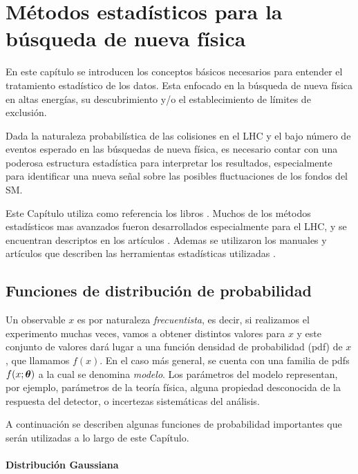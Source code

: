 \chapter{Métodos estadísticos para la búsqueda de nueva física}

En este capítulo se introducen los conceptos básicos necesarios para entender el
tratamiento estadístico de los datos. Esta enfocado en la búsqueda de nueva
física en altas energías, su descubrimiento y/o el establecimiento de límites de
exclusión.

Dada la naturaleza probabilística de las colisiones en el LHC y el bajo número
de eventos esperado en las búsquedas de nueva física, es necesario contar con
una poderosa estructura estadística para interpretar los resultados, especialmente
para identificar una nueva señal sobre las posibles fluctuaciones de los fondos
del SM.

Este Capítulo utiliza como referencia los libros \cite{Cowan,James}. Muchos de
los métodos estadísticos mas avanzados fueron desarrollados especialmente para
el LHC, y se encuentran descriptos en los artículos
\cite{AsymAprox,ReadCLs,medsigNote,Cranmer:2015nia}. Ademas se utilizaron los
manuales y artículos que describen las herramientas estadísticas utilizadas
\cite{Cranmer:1456844,HistFitter}.


\section{Funciones de distribución de probabilidad}

Un observable $x$ es por naturaleza \emph{frecuentista}, es decir, si realizamos
el experimento muchas veces, vamos a obtener distintos valores para $x$ y este
conjunto de valores dará lugar a una función densidad de probabilidad (pdf)
de $x$, que llamamos $f(x)$. En el caso más general, se cuenta con una familia
de pdfs $f(x;\bm{\theta})$ a la cual se denomina \emph{modelo}. Los parámetros del
modelo representan, por ejemplo, parámetros de la teoría física, alguna
propiedad desconocida de la respuesta del detector, o incertezas sistemáticas
del análisis.

A continuación se describen algunas funciones de probabilidad importantes que
serán utilizadas a lo largo de este Capítulo.

\subsubsection{Distribución Gaussiana}

